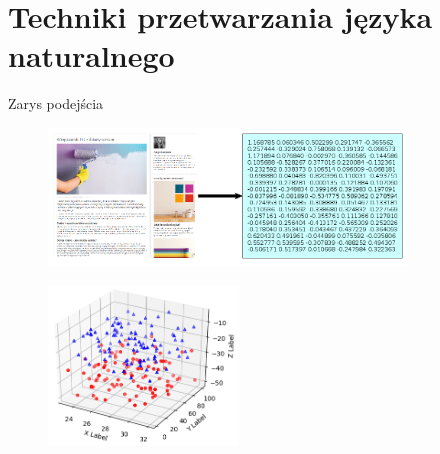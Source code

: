 \documentclass{beamer}
\begin{document}
	\section{Techniki przetwarzania języka naturalnego}
	\begin{frame}{Zarys podejścia}
		\begin{figure}
			\centering
			\includegraphics[width=0.85\textwidth]{img/approach_outline.png}
		\end{figure}
		\pause
		\begin{figure}
			\centering
			\includegraphics[width=0.45\textwidth]{img/scatter3d_demo.png}
		\end{figure}
	\end{frame}
\end{document}
